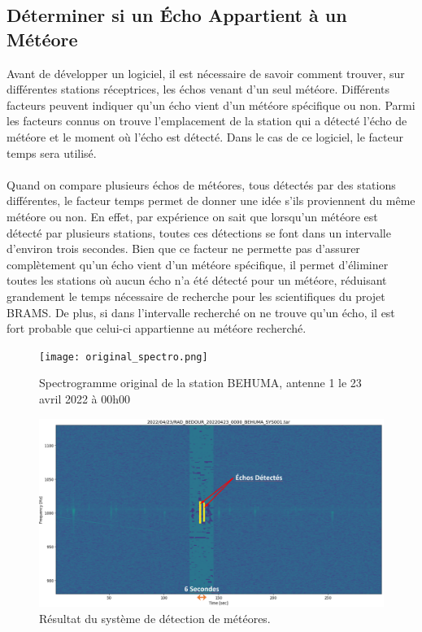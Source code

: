 \documentclass[11pt]{article}
\begin{document}
\subsection{Déterminer si un Écho Appartient à un Météore}

Avant de développer un logiciel, il est nécessaire de savoir comment trouver, sur différentes stations réceptrices, les échos venant d'un seul météore.
Différents facteurs peuvent indiquer qu'un écho vient d'un météore spécifique ou non.
Parmi les facteurs connus on trouve l'emplacement de la station qui a détecté l'écho de météore et le moment où l'écho est détecté.
Dans le cas de ce logiciel, le facteur temps sera utilisé.\\
\\
Quand on compare plusieurs échos de météores, tous détectés par des stations différentes, le facteur temps permet de donner une idée s'ils proviennent du même météore ou non.
En effet, par expérience on sait que lorsqu'un météore est détecté par plusieurs stations, toutes ces détections se font dans un intervalle d'environ trois secondes.
Bien que ce facteur ne permette pas d'assurer complètement qu'un écho vient d'un météore spécifique, il permet d'éliminer toutes les stations où aucun écho n'a été détecté pour un météore, réduisant grandement le temps nécessaire de recherche pour les scientifiques du projet BRAMS.
De plus, si dans l'intervalle recherché on ne trouve qu'un écho, il est fort probable que celui-ci appartienne au météore recherché.

\begin{figure}[htp]
    \begin{center}
        \texttt{[image: original\_spectro.png]}
        \caption{Spectrogramme original de la station BEHUMA, antenne 1 le 23 avril 2022 à 00h00}
        \label{fig:spectro-orig}
    \end{center}
\end{figure}

\begin{figure}[hbp]
    \begin{center}
        \includegraphics[scale=0.13]{meteor_detect_example.png}
        \caption{Résultat du système de détection de météores.}
        \label{fig:meteor-detect-ex}
    \end{center}
\end{figure}
\end{document}
